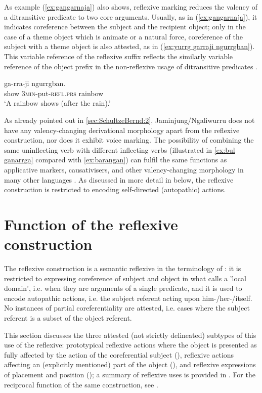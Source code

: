 \documentclass[output=paper,colorlinks,citecolor=brown]{langscibook}
\begin{document}
As example (\ref{ex:gangarnaja}) also shows, reflexive marking reduces the valency of a ditransitive predicate to two core arguments. Usually, as in (\ref{ex:gangarnaja}), it indicates coreference between the subject and the recipient object; only in the case of a theme object which is animate or a natural force, coreference of the subject with a theme object is also attested, as in (\ref{ex:yurrg garraji ngurrgban}). This variable reference of the reflexive suffix reflects the similarly variable reference of the object prefix in the non-reflexive usage of ditransitive predicates \citep{SchultzeBerndt2010}.

\ea
{} {ga-rra-ji} {ngurrgban}. \\
show \textsc{3min}-put-\textsc{refl.prs} rainbow \\
\glt `A rainbow shows (after the rain).'
\label{ex:yurrg garraji ngurrgban}
\z

As already pointed out in \ref{sec:SchultzeBernd:2}, Jaminjung/Ngaliwurru does not have any valency-changing derivational morphology apart from the reflexive construction, nor does it exhibit voice marking. The possibility of combining the same uninflecting verb with different inflecting verbs (illustrated in \ref{ex:bul ganarrga} compared with \ref{ex:barangan}) can fulfil the same functions as applicative markers, causativisers, and other valency-changing morphology in many other languages \citep[1132-1145]{SchultzeBerndt2015}. As discussed in more detail in  below, the reflexive construction is restricted to encoding self-directed (autopathic) actions. 


\section{Function of the reflexive construction} \label{sec:SchultzeBernd:4}

The reflexive construction is a semantic reflexive in the terminology of \citet[27]{Geniusiene1987}: it is restricted to expressing coreference of subject and object in what \citet{Comrie1998} calls a 'local domain', i.e. when they are arguments of a single predicate, and it is used to encode autopathic actions, i.e. the subject referent acting upon him-/her-/itself. No instances of partial coreferentiality are attested, i.e. cases where the subject referent is a subset of the object referent.

This section discusses the three attested (not strictly delineated) subtypes of this use of the reflexive: prototypical reflexive actions where the object is presented as fully affected by the action of the coreferential subject (), reflexive actions affecting an (explicitly mentioned) part of the object (), and reflexive expressions of placement and position (); a summary of reflexive uses is provided in . For the reciprocal function of the same construction, see .
\end{document}

